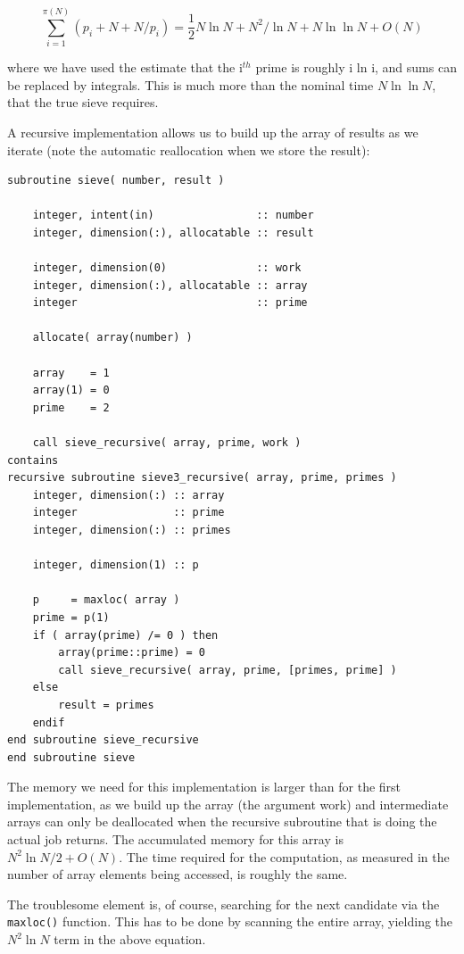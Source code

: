 \documentclass[onecolumn]{article}
\begin{document}
\begin{equation}
   \sum_{i=1}^{\pi(N)} (p_i + N + N/p_i) = \frac{1}{2} N \ln N + N^2 / {\ln N} + N \ln \ln N + O(N)
\end{equation}


where we have used the estimate that the i$^{th}$ prime is roughly i ln i, and sums can be replaced by integrals.
This is much more than the nominal time $N \ln \ln N$, that the true sieve requires.

A recursive implementation allows us to build up the array of results as we iterate (note the automatic
reallocation when we store the result):

\begin{verbatim}
subroutine sieve( number, result )

    integer, intent(in)                :: number
    integer, dimension(:), allocatable :: result

    integer, dimension(0)              :: work
    integer, dimension(:), allocatable :: array
    integer                            :: prime

    allocate( array(number) )

    array    = 1
    array(1) = 0
    prime    = 2

    call sieve_recursive( array, prime, work )
contains
recursive subroutine sieve3_recursive( array, prime, primes )
    integer, dimension(:) :: array
    integer               :: prime
    integer, dimension(:) :: primes

    integer, dimension(1) :: p

    p     = maxloc( array )
    prime = p(1)
    if ( array(prime) /= 0 ) then
        array(prime::prime) = 0
        call sieve_recursive( array, prime, [primes, prime] )
    else
        result = primes
    endif
end subroutine sieve_recursive
end subroutine sieve
\end{verbatim}

The memory we need for this implementation is larger than for the first implementation,
as we build up the array (the argument work) and intermediate arrays can only be deallocated
when the recursive subroutine that is doing the actual job returns. The accumulated memory for
this array is $N^2 \ln N / 2 + O(N)$. The time required for the computation, as measured in the number
of array elements being accessed, is roughly the same.

The troublesome element is, of course, searching for the next candidate via the \verb+maxloc()+ function.
This has to be done by scanning the entire array, yielding the $N^2 \ln N$ term in the above equation.
\end{document}
